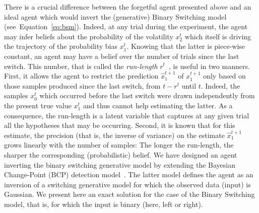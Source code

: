\documentclass[10pt,letterpaper]{article}
\newcommand{\citep}[1]{\cite{#1}}
\newcommand{\seeEq}[1]{Equation~\ref{eq:#1}}
\newcommand{\AM}[1]{\textbf{\textcolor{blue}{[AM: #1]}}}
\begin{document}
There is a crucial difference between the forgetful agent presented above
and an ideal agent which would invert the (generative) Binary Switching model (see~\seeEq{bsm}).
Indeed, at any trial during the experiment,
the agent may infer beliefs about the probability of the volatility $x_2^t$
which itself is driving the trajectory of the probability bias $x_1^t$.
Knowing that the latter is piece-wise constant,
an agent may have a belief over the number of trials since the last switch.
This number, that is called the \emph{run-length} $r^t$~\citep{AdamsMackay2007}, is useful in two manners.
First, it allows the agent to restrict the prediction $\hat{x}_1^{t+1}$ of $x_1^{t+1}$
only based on those samples produced since the last switch, from $t-r^t$ until $t$.
Indeed, the samples $x_0^t$ which occurred before the last switch
were drawn independently from the present true value $x_1^t$
and thus cannot help estimating the latter.
As a consequence, the run-length is a latent variable
that captures at any given trial all the hypotheses that may be occurring.
Second, it is known that for this estimate, the precision
(that is, the inverse of variance) on the estimate $\hat{x}_1^{t+1}$
grows linearly with the number of samples:
The longer the run-length, the sharper the corresponding (probabilistic) belief.
We have designed an agent inverting the binary switching generative model by extending
the Bayesian Change-Point (BCP) detection model~\citep{AdamsMackay2007}.
The latter model defines the agent as an inversion of a switching generative model
for which the observed data (input) is Gaussian.
We present here an exact solution for the case of the Binary Switching model,
that is, for which the input is binary (here, left or right). %
\end{document}
